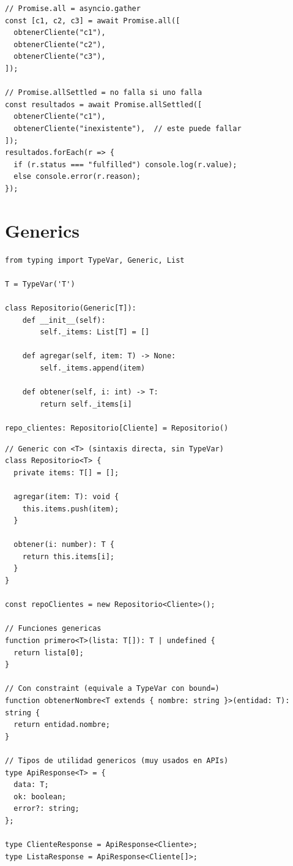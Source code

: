 \documentclass[11pt,a4paper]{article}
\begin{document}
\begin{tsbox}
\begin{lstlisting}[style=typescript]
// Promise.all = asyncio.gather
const [c1, c2, c3] = await Promise.all([
  obtenerCliente("c1"),
  obtenerCliente("c2"),
  obtenerCliente("c3"),
]);

// Promise.allSettled = no falla si uno falla
const resultados = await Promise.allSettled([
  obtenerCliente("c1"),
  obtenerCliente("inexistente"),  // este puede fallar
]);
resultados.forEach(r => {
  if (r.status === "fulfilled") console.log(r.value);
  else console.error(r.reason);
});
\end{lstlisting}
\end{tsbox}

\section{Generics}

\begin{pybox}
\begin{lstlisting}[style=python]
from typing import TypeVar, Generic, List

T = TypeVar('T')

class Repositorio(Generic[T]):
    def __init__(self):
        self._items: List[T] = []

    def agregar(self, item: T) -> None:
        self._items.append(item)

    def obtener(self, i: int) -> T:
        return self._items[i]

repo_clientes: Repositorio[Cliente] = Repositorio()
\end{lstlisting}
\end{pybox}

\begin{tsbox}
\begin{lstlisting}[style=typescript]
// Generic con <T> (sintaxis directa, sin TypeVar)
class Repositorio<T> {
  private items: T[] = [];

  agregar(item: T): void {
    this.items.push(item);
  }

  obtener(i: number): T {
    return this.items[i];
  }
}

const repoClientes = new Repositorio<Cliente>();

// Funciones genericas
function primero<T>(lista: T[]): T | undefined {
  return lista[0];
}

// Con constraint (equivale a TypeVar con bound=)
function obtenerNombre<T extends { nombre: string }>(entidad: T): string {
  return entidad.nombre;
}

// Tipos de utilidad genericos (muy usados en APIs)
type ApiResponse<T> = {
  data: T;
  ok: boolean;
  error?: string;
};

type ClienteResponse = ApiResponse<Cliente>;
type ListaResponse = ApiResponse<Cliente[]>;
\end{lstlisting}
\end{tsbox}
\end{document}

